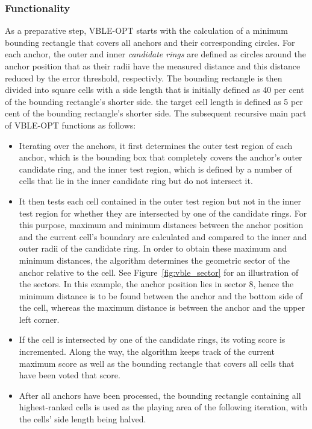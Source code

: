 \subsubsection{Functionality}
As a preparative step, VBLE-OPT starts with the calculation of a minimum bounding rectangle that covers all anchors and their corresponding circles. For each anchor, the outer and inner \emph{candidate rings} are defined as circles around the anchor position that as their radii have the measured distance and this distance reduced by the error threshold, respectivly. The bounding rectangle is then divided into square cells with a side length that is initially defined as 40 per cent of the bounding rectangle's shorter side. the target cell length is defined as 5 per cent of the bounding rectangle's shorter side. The subsequent recursive main part of VBLE-OPT functions as follows:
\begin{itemize}
\item Iterating over the anchors, it first determines the outer test region of each anchor, which is the bounding box that completely covers the anchor's outer candidate ring, and the inner test region, which is defined by a number of cells that lie in the inner candidate ring but do not intersect it.
\item It then tests each cell contained in the outer test region but not in the inner test region for whether they are intersected by one of the candidate rings. For this purpose, maximum and minimum distances between the anchor position and the current cell's boundary are calculated and compared to the inner and outer radii of the candidate ring. In order to obtain these maximum and minimum distances, the algorithm determines the geometric sector of the anchor relative to the cell. See Figure~\ref{fig:vble_sector} for an illustration of the sectors. In this example, the anchor position lies in sector 8, hence the minimum distance is to be found between the anchor and the bottom side of the cell, whereas the maximum distance is between the anchor and the upper left corner.
\item If the cell is intersected by one of the candidate rings, its voting score is incremented. Along the way, the algorithm keeps track of the current maximum score as well as the bounding rectangle that covers all cells that have been voted that score.
\item After all anchors have been processed, the bounding rectangle containing all highest-ranked cells is used as the playing area of the following iteration, with the cells' side length being halved.
\end{itemize}

